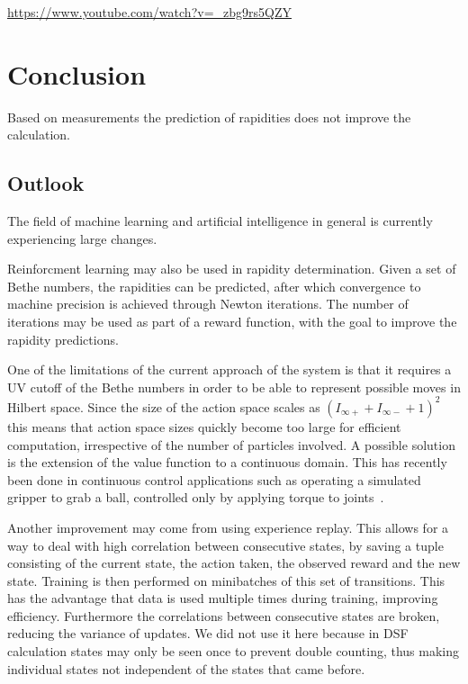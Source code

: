 \documentclass[11pt, a4paper]{report} %
\begin{document}
\url{https://www.youtube.com/watch?v=_zbg9rs5QZY}

\section{Conclusion}

Based on measurements the prediction of rapidities does not improve the calculation.

\subsection{Outlook}

The field of machine learning and artificial intelligence in general is currently experiencing large changes.

Reinforcment learning may also be used in rapidity determination.
Given a set of Bethe numbers, the rapidities can be predicted, after which convergence to machine precision is achieved through Newton iterations.
The number of iterations may be used as part of a reward function, with the goal to improve the rapidity predictions.

One of the limitations of the current approach of the system is that it requires a UV cutoff of the Bethe numbers in order to be able to represent possible moves in Hilbert space.
Since the size of the action space scales as \((I_{\infty+} + I_{\infty-} + 1)^2\) this means that action space sizes quickly become too large for efficient computation, irrespective of the number of particles involved.
A possible solution is the extension of the value function to a continuous domain.
This has recently been done in continuous control applications such as operating a simulated gripper to grab a ball, controlled only by applying torque to joints~\cite{lillicrap15_contin_contr_with_deep_reinf_learn}.

Another improvement may come from using experience replay\cite{mnih15_human_level_contr_throug_deep_reinf_learn,mnih13_playin_atari_with_deep_reinf_learn}.
This allows for a way to deal with high correlation between consecutive states, by saving a tuple consisting of the current state, the action taken, the observed reward and the new state.
Training is then performed on minibatches of this set of transitions.
This has the advantage that data is used multiple times during training, improving efficiency.
Furthermore the correlations between consecutive states are broken, reducing the variance of updates.
We did not use it here because in DSF calculation states may only be seen once to prevent double counting, thus making individual states not independent of the states that came before.
\end{document}
